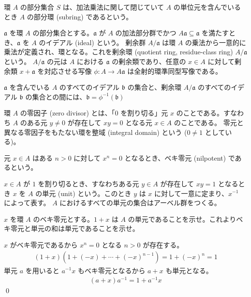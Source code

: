 \documentclass[uplatex,dvipdfmx,a4paper,11pt]{jlreq}
\makeatletter
\theoremstyle{definition}
\renewenvironment{proof}[1][\proofname]{\par
  \normalfont
  \topsep6\p@\@plus6\p@ \trivlist
  \item[\hskip\labelsep{\bfseries #1}\@addpunct{\bfseries}]\ignorespaces\quad\par
}{%
  \qed\endtrivlist\@endpefalse
}
\renewcommand\proofname{証明}
\makeatother
\begin{document}
\begin{definition}
  環 $A$ の部分集合 $S$ は、加法乗法に関して閉じていて $A$ の単位元を含んでいるとき $A$ の部分環 (subring) であるという。
\end{definition}

\begin{definition}[イデアル]
  $\mathfrak{a}$ を環 $A$ の部分集合とする。$\mathfrak{a}$ が $A$ の加法部分群でかつ $A\mathfrak{a}\subseteq\mathfrak{a}$ を満たすとき、$\mathfrak{a}$ を $A$ のイデアル (ideal) という。
  剰余群 $A/\mathfrak{a}$ は環 $A$ の乗法から一意的に乗法が定義され、環となる。これを剰余環 (quotient ring, residue-class ring) $A/\mathfrak{a}$ という。
  $A/\mathfrak{a}$ の元は $A$ における $\mathfrak{a}$ の剰余類であり、任意の $x\in A$ に対して剰余類 $x + \mathfrak{a}$ を対応させる写像 $\phi: A\to A\mathfrak{a}$ は全射的環準同型写像である。
\end{definition}

\begin{proposition}
  $\mathfrak{a}$ を含んでいる $A$ のすべてのイデアル $\mathfrak{b}$ の集合と、剰余環 $A/\mathfrak{a}$ のすべてのイデアル $\mathfrak{b}$ の集合との間には、$\mathfrak{b} = \phi^{-1}(\mathfrak{b})$
\end{proposition}

\begin{definition}[]
  環 $A$ の零因子 (zero divisor) とは、「$0$ を割り切る」元 $x$ のことである。すなわち $A$ のある元 $y \neq 0$ が存在して $xy = 0$ となる元 $x\in A$ のことである。
  零元と異なる零因子をもたない環を整域 (integral domain) という ($0 \neq 1$ としている)。

  元 $x\in A$ はある $n > 0$ に対して $x^n = 0$ となるとき、ベキ零元 (nilpotent) であるという。

  $x\in A$ が $1$ を割り切るとき、すなわちある元 $y\in A$ が存在して $xy = 1$ となるとき $x$ を $A$ の単元 (unit) という。このとき $y$ は $x$ に対して一意に定まり、$x^{-1}$ によって表す。
  $A$ におけるすべての単元の集合はアーベル群をつくる。
\end{definition}

\begin{proposition}
  $x$ を環 $A$ のベキ零元とする。$1 + x$ は $A$ の単元であることを示せ。これよりベキ零元と単元の和は単元であることを示せ。
\end{proposition}
\begin{proof}
  $x$ がベキ零元であるから $x^n = 0$ となる $n > 0$ が存在する。
  \begin{align}
    (1 + x)(1 + (-x) + \cdots + (-x)^{n-1}) = 1 + (-x)^n = 1
  \end{align}
  単元 $a$ を用いると $a^{-1}x$ もベキ零元となるから $a + x$ も単元となる。
  \begin{align}
    (a + x)a^{-1} = 1 + a^{-1}x
  \end{align}
\end{proof}
\end{document}

